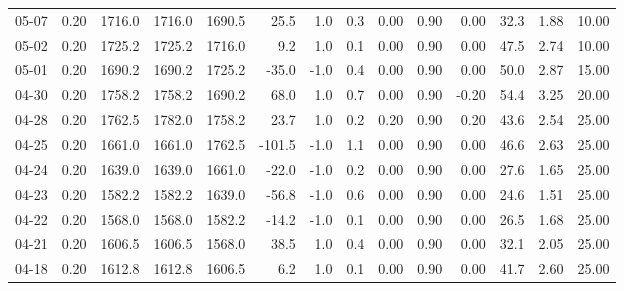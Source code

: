 \begin{threeparttable}
{\begin{tabular}{lrrrrrrrrrrrrr}
  05-07 &     0.20 & 1716.0 & 1716.0 & 1690.5 &       25.5 &                      1.0 &                 0.3 &       0.00 &      0.90 &           0.00 &             32.3 &            1.88 &                  10.00 \\
  05-02 &     0.20 & 1725.2 & 1725.2 & 1716.0 &        9.2 &                      1.0 &                 0.1 &       0.00 &      0.90 &           0.00 &             47.5 &            2.74 &                  10.00 \\
  05-01 &     0.20 & 1690.2 & 1690.2 & 1725.2 &      -35.0 &                     -1.0 &                 0.4 &       0.00 &      0.90 &           0.00 &             50.0 &            2.87 &                  15.00 \\
  04-30 &     0.20 & 1758.2 & 1758.2 & 1690.2 &       68.0 &                      1.0 &                 0.7 &       0.00 &      0.90 &          -0.20 &             54.4 &            3.25 &                  20.00 \\
  04-28 &     0.20 & 1762.5 & 1782.0 & 1758.2 &       23.7 &                      1.0 &                 0.2 &       0.20 &      0.90 &           0.20 &             43.6 &            2.54 &                  25.00 \\
  04-25 &     0.20 & 1661.0 & 1661.0 & 1762.5 &     -101.5 &                     -1.0 &                 1.1 &       0.00 &      0.90 &           0.00 &             46.6 &            2.63 &                  25.00 \\
  04-24 &     0.20 & 1639.0 & 1639.0 & 1661.0 &      -22.0 &                     -1.0 &                 0.2 &       0.00 &      0.90 &           0.00 &             27.6 &            1.65 &                  25.00 \\
  04-23 &     0.20 & 1582.2 & 1582.2 & 1639.0 &      -56.8 &                     -1.0 &                 0.6 &       0.00 &      0.90 &           0.00 &             24.6 &            1.51 &                  25.00 \\
  04-22 &     0.20 & 1568.0 & 1568.0 & 1582.2 &      -14.2 &                     -1.0 &                 0.1 &       0.00 &      0.90 &           0.00 &             26.5 &            1.68 &                  25.00 \\
  04-21 &     0.20 & 1606.5 & 1606.5 & 1568.0 &       38.5 &                      1.0 &                 0.4 &       0.00 &      0.90 &           0.00 &             32.1 &            2.05 &                  25.00 \\
  04-18 &     0.20 & 1612.8 & 1612.8 & 1606.5 &        6.2 &                      1.0 &                 0.1 &       0.00 &      0.90 &           0.00 &             41.7 &            2.60 &                  25.00 \\

\end{tabular}}
\end{threeparttable}
